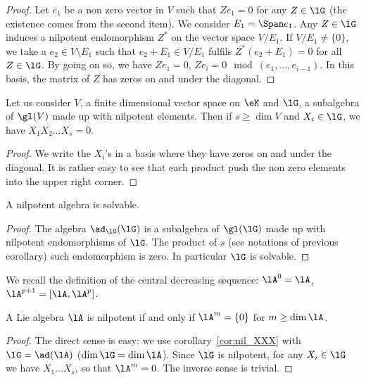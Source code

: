 \begin{proof}
	 Let $e_1$ be a non zero vector in $V$ such that $Ze_1=0$ for any $Z\in\lG$ (the existence comes from the second item). We consider $E_1=\Span e_1$. Any $Z\in\lG$ induces a nilpotent endomorphism $Z^*$ on the vector space $V/E_1$. If $V/E_1\neq\{0\}$, we take a $e_2\in V\setminus E_1$ such that $e_2+E_1\in V/E_1$ fulfils $Z^*(e_2+E_1)=0$ for all $Z\in\lG$. By going on so, we have $Ze_1=0$, $Ze_i=0\mod(e_1,\ldots,e_{i-1})$. In this basis, the matrix of $Z$ has zeros on and under the diagonal.
\end{proof}

\begin{corollary}
	Let us consider $V$, a finite dimensional vector space on $\eK$ and $\lG$, a subalgebra of $\gl(V)$ made up with nilpotent elements. Then if $s\geq\dim V$ and $X_i\in\lG$, we have $X_1X_2\ldots X_s=0$.
	\label{cor:nil_XXX}
\end{corollary}

\begin{proof}
	We write the $X_i$'s in a basis where they have zeros on and under the diagonal. It is rather easy to see that each product push the non zero elements into the upper right corner.
\end{proof}

\begin{corollary}
	A nilpotent algebra is solvable.
\end{corollary}

\begin{proof}
	The algebra $\ad_{\lG}(\lG)$ is a subalgebra of $\gl(\lG)$ made up with nilpotent endomorphisms of $\lG$. The product of $s$ (see notations of previous corollary) such endomorphism is zero. In particular $\lG$ is solvable.
\end{proof}

We recall the definition of the central decreasing sequence: $\lA^0=\lA$, $\lA^{p+1}=[\lA,\lA^p]$.

\begin{corollary}
	A Lie algebra $\lA$ is nilpotent if and only if $\lA^m=\{0\}$ for $m\geq\dim\lA$.
	\label{cor:nil_Gn}
\end{corollary}

\begin{proof}
	The direct sense is easy: we use corollary~\ref{cor:nil_XXX} with $\lG=\ad(\lA)$ ($\dim\lG=\dim\lA$). Since $\lG$ is nilpotent, for any $X_i\in\lG$ we have $X_1\ldots X_s$, so that $\lA^m=0$. The inverse sense is trivial.

\end{proof}

